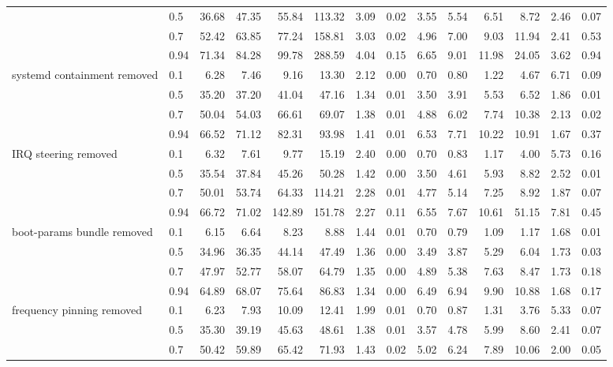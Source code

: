 \begin{table}
{\begin{tabular}{llrrrrrrrrrrrr}
 & 0.5 & 36.68 & 47.35 & 55.84 & 113.32 & 3.09 & 0.02 & 3.55 & 5.54 & 6.51 & 8.72 & 2.46 & 0.07 \\
 & 0.7 & 52.42 & 63.85 & 77.24 & 158.81 & 3.03 & 0.02 & 4.96 & 7.00 & 9.03 & 11.94 & 2.41 & 0.53 \\
 & 0.94 & 71.34 & 84.28 & 99.78 & 288.59 & 4.04 & 0.15 & 6.65 & 9.01 & 11.98 & 24.05 & 3.62 & 0.94 \\
\cmidrule{1-14}
\multirow[t]{4}{*}{systemd containment removed} & 0.1 & 6.28 & 7.46 & 9.16 & 13.30 & 2.12 & 0.00 & 0.70 & 0.80 & 1.22 & 4.67 & 6.71 & 0.09 \\
 & 0.5 & 35.20 & 37.20 & 41.04 & 47.16 & 1.34 & 0.01 & 3.50 & 3.91 & 5.53 & 6.52 & 1.86 & 0.01 \\
 & 0.7 & 50.04 & 54.03 & 66.61 & 69.07 & 1.38 & 0.01 & 4.88 & 6.02 & 7.74 & 10.38 & 2.13 & 0.02 \\
 & 0.94 & 66.52 & 71.12 & 82.31 & 93.98 & 1.41 & 0.01 & 6.53 & 7.71 & 10.22 & 10.91 & 1.67 & 0.37 \\
\cmidrule{1-14}
\multirow[t]{4}{*}{IRQ steering removed} & 0.1 & 6.32 & 7.61 & 9.77 & 15.19 & 2.40 & 0.00 & 0.70 & 0.83 & 1.17 & 4.00 & 5.73 & 0.16 \\
 & 0.5 & 35.54 & 37.84 & 45.26 & 50.28 & 1.42 & 0.00 & 3.50 & 4.61 & 5.93 & 8.82 & 2.52 & 0.01 \\
 & 0.7 & 50.01 & 53.74 & 64.33 & 114.21 & 2.28 & 0.01 & 4.77 & 5.14 & 7.25 & 8.92 & 1.87 & 0.07 \\
 & 0.94 & 66.72 & 71.02 & 142.89 & 151.78 & 2.27 & 0.11 & 6.55 & 7.67 & 10.61 & 51.15 & 7.81 & 0.45 \\
\cmidrule{1-14}
\multirow[t]{4}{*}{boot-params bundle removed} & 0.1 & 6.15 & 6.64 & 8.23 & 8.88 & 1.44 & 0.01 & 0.70 & 0.79 & 1.09 & 1.17 & 1.68 & 0.01 \\
 & 0.5 & 34.96 & 36.35 & 44.14 & 47.49 & 1.36 & 0.00 & 3.49 & 3.87 & 5.29 & 6.04 & 1.73 & 0.03 \\
 & 0.7 & 47.97 & 52.77 & 58.07 & 64.79 & 1.35 & 0.00 & 4.89 & 5.38 & 7.63 & 8.47 & 1.73 & 0.18 \\
 & 0.94 & 64.89 & 68.07 & 75.64 & 86.83 & 1.34 & 0.00 & 6.49 & 6.94 & 9.90 & 10.88 & 1.68 & 0.17 \\
\cmidrule{1-14}
\multirow[t]{4}{*}{frequency pinning removed} & 0.1 & 6.23 & 7.93 & 10.09 & 12.41 & 1.99 & 0.01 & 0.70 & 0.87 & 1.31 & 3.76 & 5.33 & 0.07 \\
 & 0.5 & 35.30 & 39.19 & 45.63 & 48.61 & 1.38 & 0.01 & 3.57 & 4.78 & 5.99 & 8.60 & 2.41 & 0.07 \\
 & 0.7 & 50.42 & 59.89 & 65.42 & 71.93 & 1.43 & 0.02 & 5.02 & 6.24 & 7.89 & 10.06 & 2.00 & 0.05 \\

\end{tabular}}
\end{table}
